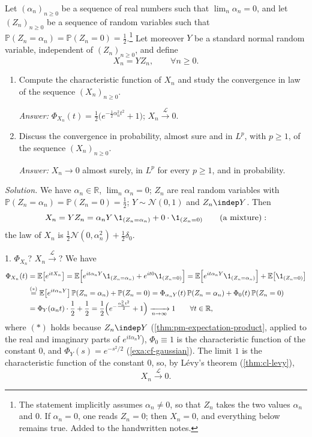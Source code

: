 \begin{example}\label{exa:ct-exam}
Let $(\alpha_n)_{n\ge0}$ be a sequence of real numbers such that $\lim_n\alpha_n=0$, and let
$(Z_n)_{n\ge0}$ be a sequence of random variables such that
$\mathbb P(Z_n=\alpha_n)=\mathbb P(Z_n=0)=\frac12$.\footnote{The statement implicitly assumes
$\alpha_n\ne0$, so that $Z_n$ takes the two values $\alpha_n$ and $0$. If $\alpha_n=0$, one reads
$Z_n=0$; then $X_n=0$, and everything below remains true. Added to the handwritten notes.} Let
moreover $Y$ be a standard normal random variable, independent of $(Z_n)_{n\ge0}$, and define
\[
  X_n=YZ_n,\qquad\forall n\ge0 .
\]
\begin{enumerate}[label=\arabic*.]
  \item Compute the characteristic function of $X_n$ and study the convergence in law of the
    sequence $(X_n)_{n\ge0}$.

    \emph{Answer:} $\Phi_{X_n}(t)=\frac12\big(e^{-\frac12\alpha_n^2t^2}+1\big)$;
    $X_n\xrightarrow{\mathcal L}0$.
  \item Discuss the convergence in probability, almost sure and in $L^p$, with $p\ge1$, of the
    sequence $(X_n)_{n\ge0}$.

    \emph{Answer:} $X_n\to0$ almost surely, in $L^p$ for every $p\ge1$, and in probability.
\end{enumerate}

\emph{Solution.} We have $\alpha_n\in\mathbb R$, $\lim_n\alpha_n=0$; $Z_n$ are real random
variables with $\mathbb P(Z_n=\alpha_n)=\mathbb P(Z_n=0)=\frac12$; $Y\sim\mathcal N(0,1)$ and
$Z_n\indep Y$. Then
\[
  X_n=YZ_n=\alpha_nY\,\1_{(Z_n=\alpha_n)}+0\cdot\1_{(Z_n=0)}\qquad\text{(a mixture)}:
\]
the law of $X_n$ is $\frac12\mathcal N(0,\alpha_n^2)+\frac12\delta_0$.

1. $\Phi_{X_n}$? $X_n\xrightarrow{\mathcal L}$? We have
\[
\begin{aligned}
  \Phi_{X_n}(t)&=\mathbb E\big[e^{itX_n}\big]
  =\mathbb E\Big[e^{it\alpha_nY}\1_{(Z_n=\alpha_n)}+e^{it0}\1_{(Z_n=0)}\Big]
  =\mathbb E\Big[e^{it\alpha_nY}\1_{(Z_n=\alpha_n)}\Big]+\mathbb E\big[\1_{(Z_n=0)}\big]\\
  &\overset{(\ast)}{=}\mathbb E\big[e^{it\alpha_nY}\big]\,\mathbb P(Z_n=\alpha_n)+\mathbb P(Z_n=0)
  =\Phi_{\alpha_nY}(t)\,\mathbb P(Z_n=\alpha_n)+\Phi_0(t)\,\mathbb P(Z_n=0)\\
  &=\Phi_Y(\alpha_nt)\cdot\frac12+\frac12
  =\frac12\Big(e^{-\frac{\alpha_n^2t^2}2}+1\Big)\xrightarrow[n\to\infty]{}1\qquad\forall t\in\mathbb R,
\end{aligned}
\]
where $(\ast)$ holds because $Z_n\indep Y$ (\cref{thm:pm-expectation-product}, applied to the real
and imaginary parts of $e^{it\alpha_nY}$), $\Phi_0\equiv1$ is the characteristic function of the
constant $0$, and $\Phi_Y(s)=e^{-s^2/2}$ (\cref{exa:cf-gaussian}). The limit $1$ is the
characteristic function of the constant $0$, so, by Lévy's theorem (\cref{thm:cl-levy}),
\[
  X_n\xrightarrow{\mathcal L}0 .
\]


\end{example}
